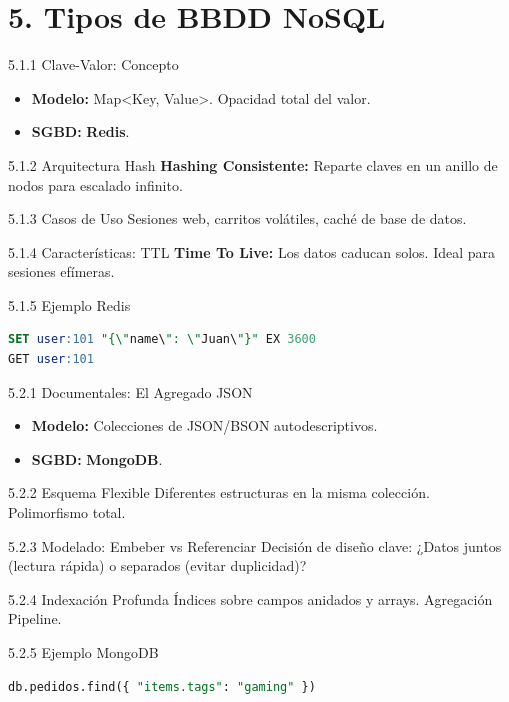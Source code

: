\section{5. Tipos de BBDD NoSQL}

\begin{frame}{5.1.1 Clave-Valor: Concepto}
    \begin{itemize}
        \item \textbf{Modelo:} Map<Key, Value>. Opacidad total del valor.
        \item \textbf{SGBD:} \textbf{Redis}.
    \end{itemize}
\end{frame}
\begin{frame}{5.1.2 Arquitectura Hash}
    \textbf{Hashing Consistente:} Reparte claves en un anillo de nodos para escalado infinito.
\end{frame}
\begin{frame}{5.1.3 Casos de Uso}
    Sesiones web, carritos volátiles, caché de base de datos.
\end{frame}
\begin{frame}{5.1.4 Características: TTL}
    \textbf{Time To Live:} Los datos caducan solos. Ideal para sesiones efímeras.
\end{frame}
\begin{frame}[fragile]{5.1.5 Ejemplo Redis}
    \begin{lstlisting}[language=SQL]
SET user:101 "{\"name\": \"Juan\"}" EX 3600
GET user:101
    \end{lstlisting}
\end{frame}

\begin{frame}{5.2.1 Documentales: El Agregado JSON}
    \begin{itemize}
        \item \textbf{Modelo:} Colecciones de JSON/BSON autodescriptivos.
        \item \textbf{SGBD:} \textbf{MongoDB}.
    \end{itemize}
\end{frame}
\begin{frame}{5.2.2 Esquema Flexible}
    Diferentes estructuras en la misma colección. Polimorfismo total.
\end{frame}
\begin{frame}{5.2.3 Modelado: Embeber vs Referenciar}
    Decisión de diseño clave: ¿Datos juntos (lectura rápida) o separados (evitar duplicidad)?
\end{frame}
\begin{frame}{5.2.4 Indexación Profunda}
    Índices sobre campos anidados y arrays. Agregación Pipeline.
\end{frame}
\begin{frame}[fragile]{5.2.5 Ejemplo MongoDB}
    \begin{lstlisting}[language=SQL]
db.pedidos.find({ "items.tags": "gaming" })
    \end{lstlisting}
\end{frame}

